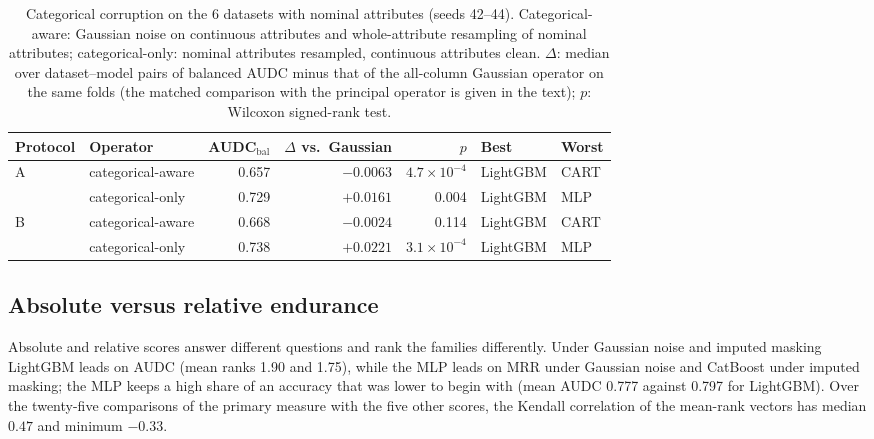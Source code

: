 \documentclass[pdflatex,sn-mathphys]{sn-jnl}
\theoremstyle{thmstyleone}
\theoremstyle{thmstyletwo}
\theoremstyle{thmstylethree}
\begin{document}
\begin{table}[t]
\centering
\footnotesize
\caption{Categorical corruption on the 6 datasets with nominal attributes (seeds 42--44). Categorical-aware: Gaussian noise on continuous attributes and whole-attribute resampling of nominal attributes; categorical-only: nominal attributes resampled, continuous attributes clean. $\Delta$: median over dataset--model pairs of balanced AUDC minus that of the all-column Gaussian operator on the same folds (the matched comparison with the principal operator is given in the text); $p$: Wilcoxon signed-rank test.}
\label{tab:categorical}
\begin{tabular}{@{}llrrrll@{}}
\toprule
Protocol & Operator & AUDC$_{\mathrm{bal}}$ & $\Delta$ vs.\ Gaussian & $p$ & Best & Worst \\
\midrule
A & categorical-aware & 0.657 & $-0.0063$ & $4.7\times10^{-4}$ & LightGBM & CART \\
 & categorical-only & 0.729 & $+0.0161$ & 0.004 & LightGBM & MLP \\
B & categorical-aware & 0.668 & $-0.0024$ & 0.114 & LightGBM & CART \\
 & categorical-only & 0.738 & $+0.0221$ & $3.1\times10^{-4}$ & LightGBM & MLP \\
\bottomrule
\end{tabular}
\end{table}


\subsection{Absolute versus relative endurance}\label{sec:res:absrel}

Absolute and relative scores answer different questions and rank the families differently. Under Gaussian noise and imputed masking LightGBM leads on AUDC (mean ranks 1.90 and 1.75), while the MLP leads on MRR under Gaussian noise and CatBoost under imputed masking; the MLP keeps a high share of an accuracy that was lower to begin with (mean AUDC 0.777 against 0.797 for LightGBM). Over the twenty-five comparisons of the primary measure with the five other scores, the Kendall correlation of the mean-rank vectors has median $0.47$ and minimum $-0.33$.
\end{document}
